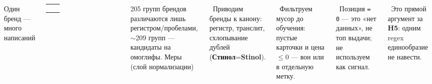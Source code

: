 \begin{frame}[t]
\begin{columns}[T]
{\InterSemi\fontsize{8.5}{10.5}\selectfont Один бренд — много написаний}\par\vspace{5pt}
{\renewcommand{\arraystretch}{1.3}\setlength{\tabcolsep}{5pt}
\begin{tabular}{|L{3.0cm}|L{3.4cm}|}
\hline
{} & \\
\hline
{} & \\
\hline
{} & \\
\hline
{} & \\
\hline
\end{tabular}}
\vspace{5pt}\par
{\smalltext\color{mvgray} 205 групп брендов различаются лишь регистром/пробелами, $\sim$209 групп — кандидаты на омоглифы.}
{\InterSemi\fontsize{8.5}{10.5}\selectfont Меры (слой нормализации)}\par\vspace{6pt}
{\smalltext
{}\ Приводим бренды к канону: регистр, транслит, схлопывание дублей (\textbf{Стинол}=\textbf{Stinol}).\par\vspace{5pt}
\ Фильтруем мусор до обучения: пустые карточки и цена $\le$0 — вон или в отдельную метку.\par\vspace{5pt}
\ Позиция \texttt{= 0} — это «нет данных», не топ выдачи; не используем как сигнал.\par\vspace{5pt}
\ Это прямой аргумент за \textbf{H5}: одним regex единообразие не навести.}
\end{columns}
\slidefoot
\end{frame}

